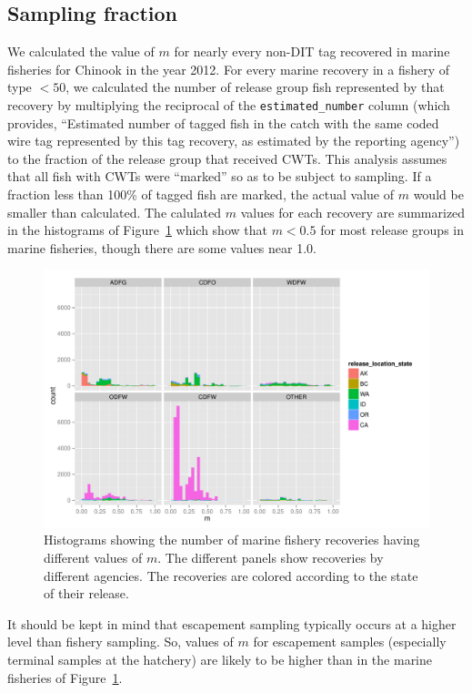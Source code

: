 \documentclass[11pt]{article}
\begin{document}
\subsection{Sampling fraction}
We calculated the value of $m$ for nearly every non-DIT tag recovered in marine fisheries
for Chinook in the year 2012.  For every marine recovery in a fishery of type $<50$, we
calculated the number of release group
fish represented by that recovery by multiplying the reciprocal of the {\tt estimated\_number} column
(which provides, ``Estimated number of tagged fish in the catch with the same coded wire
tag represented by this tag recovery, as estimated by the reporting agency'') to the
fraction of the release group that received CWTs.  This analysis assumes that all fish with CWTs were ``marked'' so 
as to be subject to sampling.  If a fraction less than 100\% of tagged fish are marked, the actual value of $m$
would be smaller than calculated.  The calulated $m$ values for each recovery are summarized in the 
histograms of Figure~\ref{fig:mhists} which show that $m < 0.5$ for most release groups
in marine fisheries, though there are some values near 1.0.
\begin{figure}
\centering
\includegraphics[width = \textwidth]{./images/m_histo_chinook.pdf}
\caption{Histograms showing the number of marine fishery recoveries having different values of $m$.  The different
panels show recoveries by different agencies.  The recoveries are colored according to the 
state of their release.}
\label{fig:mhists}
\end{figure}
It should be kept in mind that escapement sampling typically occurs at a higher level than fishery sampling. So,
values of $m$ for escapement samples (especially terminal samples at the hatchery) are likely to be higher than
in the marine fisheries of Figure~\ref{fig:mhists}.
  
\end{document}
